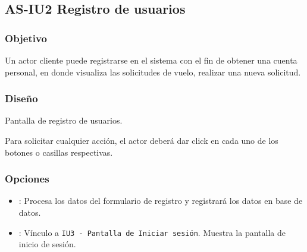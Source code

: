 %

\subsection{AS-IU2 Registro de usuarios}

\subsubsection{Objetivo}
	Un actor cliente puede registrarse en el sistema con el fin de obtener 
una cuenta personal, en donde visualiza las solicitudes de vuelo, realizar una 
nueva solicitud.

\subsubsection{Diseño}

{Pantalla de registro de usuarios.}

	Para solicitar cualquier acción, el actor deberá dar click en cada uno 
de los botones o casillas respectivas.

\subsubsection{Opciones}
\begin{itemize}
	\item {}: Procesa los datos del formulario de 
	registro y registrará los datos en base de datos.
	\item {}: Vínculo a \texttt{IU3 - Pantalla de 
	Iniciar sesión}. Muestra la pantalla de inicio de sesión.
\end{itemize}

